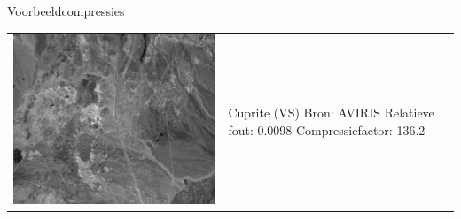 \documentclass[t,12pt,dutch
\ifx\beamermode\undefined\else,\beamermode\fi
]{beamer}
\begin{document}
\begin{frame}{Voorbeeldcompressies}

\begin{table}[H]
\centering
\begin{tabular}{C{0.6\textwidth}  L{0.4\textwidth}}
\includegraphics[width=\linewidth]{images/example_compression_Cuprite_0_01.png}
&
Cuprite (VS)\newline
Bron: AVIRIS\newline
\vspace{5mm}
Relatieve fout: 0.0098
Compressiefactor: 136.2
\end{tabular}
\end{table}

\end{frame}
\end{document}

